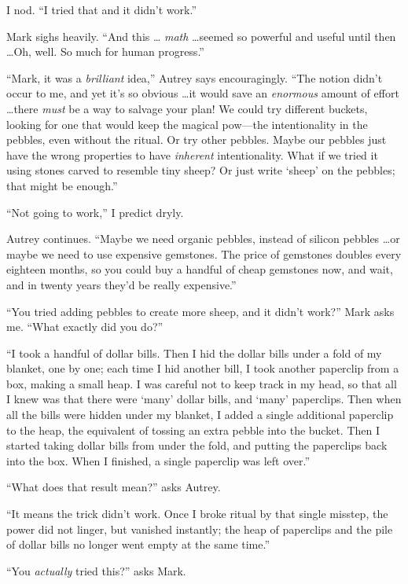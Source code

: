 {
 I nod. ``I tried that and it
didn't work.''}

{
 Mark sighs heavily. ``And this \ldots
\textit{math} \ldots seemed so powerful and useful until then \ldots Oh,
well. So much for human progress.''}

{
 ``Mark, it was a \textit{brilliant}
idea,'' Autrey says encouragingly.
``The notion didn't occur to me, and
yet it's so obvious \ldots it would save an
\textit{enormous} amount of effort \ldots there \textit{must} be a way
to salvage your plan! We could try different buckets, looking for one
that would keep the magical pow---the intentionality in the pebbles,
even without the ritual. Or try other pebbles. Maybe our pebbles just
have the wrong properties to have \textit{inherent} intentionality.
What if we tried it using stones carved to resemble tiny sheep? Or just
write `sheep' on the pebbles; that might
be enough.''}

{
 ``Not going to work,'' I
predict dryly.}

{
 Autrey continues. ``Maybe we need organic
pebbles, instead of silicon pebbles \ldots or maybe we need to use
expensive gemstones. The price of gemstones doubles every eighteen
months, so you could buy a handful of cheap gemstones now, and wait,
and in twenty years they'd be really
expensive.''}

{
 ``You tried adding pebbles to create more sheep,
and it didn't work?'' Mark asks me.
``What exactly did you do?''}

{
 ``I took a handful of dollar bills. Then I hid
the dollar bills under a fold of my blanket, one by one; each time I
hid another bill, I took another paperclip from a box, making a small
heap. I was careful not to keep track in my head, so that all I knew
was that there were `many' dollar bills,
and `many' paperclips. Then when all the
bills were hidden under my blanket, I added a single additional
paperclip to the heap, the equivalent of tossing an extra pebble into
the bucket. Then I started taking dollar bills from under the fold, and
putting the paperclips back into the box. When I finished, a single
paperclip was left over.''}

{
 ``What does that result mean?''
asks Autrey.}

{
 ``It means the trick didn't work.
Once I broke ritual by that single misstep, the power did not linger,
but vanished instantly; the heap of paperclips and the pile of dollar
bills no longer went empty at the same time.''}

{
 ``You \textit{actually} tried
this?'' asks Mark.}

